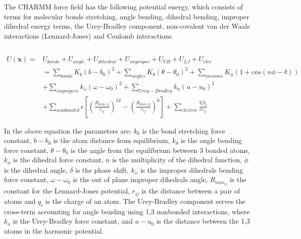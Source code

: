 The CHARMM force field has the following potential energy, which consists of terms for molecular bonds stretching, angle bending, dihedral bending, improper dihedral energy terms, the Urey-Bradley component, non-covalent van der Waals interactions (Lennard-Jones) and Coulomb interactions. 

$$$$

\begin{equation}
\begin{aligned}
U(\mathbf{x})={}&U_{bonds}+U_{angle}+U_{dihedral}+U_{improper}+U_{UB}+U_{LJ}+U_{elec}\\
&=\sum_{bonds}K_{b}(b-b_{0})^{2}+\sum_{angles}K_{\theta}(\theta-\theta_{0})^{2}+\sum_{torsions}K_{\phi}\left(1+cos(n\phi-\delta)\right)\\
&+\sum_{impropers}k_{\omega}\left(\omega-\omega_{0}\right)^{2}+\sum_{Urey-Bradley}k_{u}\left(u-u_{0}\right)^{2}\\
&+\sum_{nonbonded}\epsilon\left[\left(\frac{R_{min,ij}}{r_{ij}}\right)^{12}-\left(\frac{R_{min,ij}}{r_{ij}}\right)^{6}\right]+\sum_{electric}\frac{q_{i}q_{j}}{\epsilon r_{ij}}
\end{aligned}
\end{equation}

In the above equation the parameters are: $k_b$ is the bond stretching force constant, $b-b_0$ is the atom distance from equilibrium, $k_\theta$ is the angle bending force constant, $\theta-\theta_0$ is the angle from the equilibrium between 3 bonded atoms, $k_\phi$ is the dihedral force constant, $n$ is the multiplicity of the dihedral function, $\phi$ is the dihedral angle, $\delta$ is the phase shift, $k_\omega$ is the improper dihedrals bending force constant, $\omega-\omega_0$ is the out of plane improper dihedrals angle, $R_{{min}_{ij}}$ is the constant for the Lennard-Jones potential, $r_{ij}$ is the distance between a pair of atoms and $q_{i}$ is the charge of an atom. The Urey-Bradley component serves the cross-term accounting for angle bending using 1,3 nonbonded interactions, where $k_{u}$ is the Urey-Bradley force constant, and $u-u_{0}$ is the distance between the 1,3 atoms in the harmonic potential.

